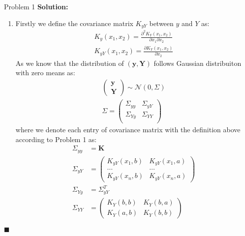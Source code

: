 \documentclass{article}
\newenvironment{solution}                               %
{\textbf{Solution:} }{$\blacksquare$}                   %
\newcommand{\Gaussian}{\mathcal{N}}                     %
\renewcommand{\vec}[1]{\mathbf{#1}}                     %
\begin{document}
\begin{section}{Problem 1}
        \begin{solution}
            \begin{enumerate}[label=\alph*)]
                \item %
                Firstly we define the covariance matrix $K_{yY}$ between $y$ and $Y$ as:
                \begin{gather*}
                    K_y(x_1, x_2) = \frac{\partial^2 K_Y(x_1,x_2)}{\partial x_1 \partial x_2} \\
                    K_{yY}(x_1, x_2) = \frac{\partial K_Y(x_1, x_2)}{\partial x_2}
                \end{gather*}
                As we know that the distribution of $(\vec{y}, \vec{Y})$ follows Gaussian distribuiton with zero means as:
                \begin{gather*}
                    \begin{pmatrix}
                        \vec{y} \\ \vec{Y}
                    \end{pmatrix}
                    \sim \Gaussian(0, \Sigma)
                    \\
                    \Sigma = \begin{pmatrix}
                        \Sigma_{yy} & \Sigma_{yY} \\
                        \Sigma_{Yy} & \Sigma_{YY} \\
                    \end{pmatrix}
                \end{gather*}
                where we denote each entry of covariance matrix with the definition above according to Problem 1 as:
                \begin{align*}
                    \Sigma_{yy} &= \vec{K} \\
                    \Sigma_{yY} &= \begin{pmatrix}
                        K_{yY}(x_1, b) & K_{yY}(x_1, a) \\
                        \dots & \dots \\
                        K_{yY}(x_n, b) & K_{yY}(x_n, a)
                    \end{pmatrix} \\
                    \Sigma_{Yy} &= \Sigma_{yY}^T \\
                    \Sigma_{YY} &= \begin{pmatrix}
                        K_Y(b,b) & K_Y(b,a) \\
                        K_Y(a,b) & K_Y(b,b)
                    \end{pmatrix}
                \end{align*}
                

\end{enumerate}
\end{solution}
\end{section}
\end{document}

